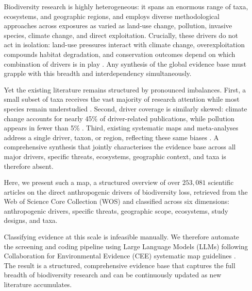 \documentclass[12pt]{article}
\begin{document}
Biodiversity research is highly heterogeneous: it spans an enormous range of taxa, ecosystems, and geographic regions, and employs diverse methodological approaches across exposures as varied as land-use change, pollution, invasive species, climate change, and direct exploitation. Crucially, these drivers do not act in isolation: land-use pressures interact with climate change, overexploitation compounds habitat degradation, and conservation outcomes depend on which combination of drivers is in play \cite{spm_ga_ipbes_2019, spm_nxs_ipbes_2024}. Any synthesis of the global evidence base must grapple with this breadth and interdependency simultaneously.

Yet the existing literature remains structured by pronounced imbalances. First, a small subset of taxa receives the vast majority of research attention while most species remain understudied \cite{troudet2017taxonomic, gorneau2023measuring, bonnet2002taxonomic, marco_changing_trends_biases}. Second, driver coverage is similarly skewed: climate change accounts for nearly 45\% of driver-related publications, while pollution appears in fewer than 5\% \cite{mazor_et_all_mismatch_of_policy}. Third, existing systematic maps and meta-analyses address a single driver, taxon, or region, reflecting these same biases \cite{feeley2017most, moullec_identifying_2021, jaureguiberry_direct_2022, duenas_threat_2021}. A comprehensive synthesis that jointly characterises the evidence base across all major drivers, specific threats, ecosystems, geographic context, and taxa is therefore absent.

Here, we present such a map, a structured overview of over $253,081$ scientific articles on the direct anthropogenic drivers of biodiversity loss, retrieved from the Web of Science Core Collection (WOS) and classified across six dimensions: anthropogenic drivers, specific threats, geographic scope, ecosystems, study designs, and taxa.

Classifying evidence at this scale is infeasible manually.  We therefore automate the screening and coding pipeline using Large Language Models (LLMs) following Collaboration for Environmental Evidence (CEE) systematic map guidelines \cite{CEE_Guidelines_5_1_2022, nunez-mir_automated_2016}. The result is a structured, comprehensive evidence base that captures the full breadth of biodiversity research and can be continuously updated as new literature accumulates.
\end{document}
